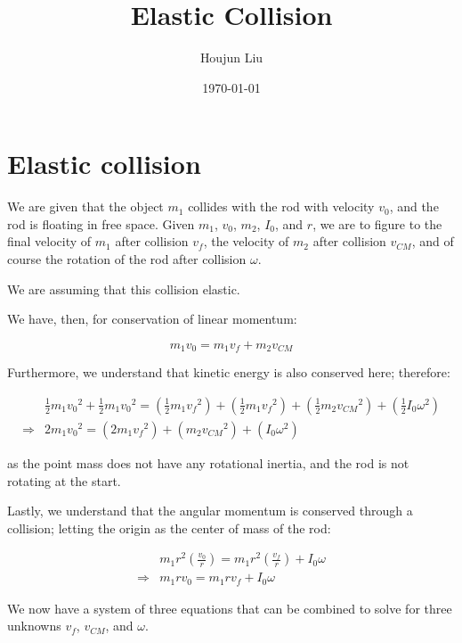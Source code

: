 \documentclass[letterpaper]{article}
\author{Houjun Liu}
\date{\today}
\title{Elastic Collision}
\renewcommand{\tableofcontents}{}
\renewcommand\maketitle{}
\begin{document}
\maketitle
\tableofcontents


\section{Elastic collision}
\label{sec:orga657e5a}
We are given that the object \(m_1\) collides with the rod with velocity \(v_0\), and the rod is floating in free space. Given \(m_1\), \(v_0\), \(m_2\), \(I_0\), and \(r\), we are to figure to the final velocity of \(m_1\) after collision \(v_f\), the velocity of \(m_2\) after collision \(v_{CM}\), and of course the rotation of the rod after collision \(\omega\).

We are assuming that this collision elastic.

We have, then, for conservation of linear momentum:

\begin{equation}
 m_1 v_0 = m_1v_f + m_2 v_{CM} 
\end{equation}

Furthermore, we understand that kinetic energy is also conserved here; therefore:

\begin{align}
&\frac{1}{2} m_1{v_0}^2 + \frac{1}{2} m_1 {v_0}^2 = \left(\frac{1}{2} m_1{v_f}^2\right)+\left(\frac{1}{2} m_1{v_f}^2\right)+\left(\frac{1}{2} m_2{v_{CM}}^2\right)+\left(\frac{1}{2} I_0{\omega}^2\right)\\
\Rightarrow & 2m_1{v_0}^2 = \left( 2m_1{v_f}^2\right)+\left( m_2{v_{CM}}^2\right)+\left( I_0{\omega}^2\right)
\end{align}

as the point mass does not have any rotational inertia, and the rod is not rotating at the start.

Lastly, we understand that the angular momentum is conserved through a collision; letting the origin as the center of mass of the rod:

\begin{align}
   &m_1 r^2 \left(\frac{v_0}{r}\right) = m_1 r^2 \left(\frac{v_f}{r}\right) + I_0 \omega\\
\Rightarrow &m_1 r v_0 = m_1 r v_f + I_0 \omega
\end{align}

We now have a system of three equations that can be combined to solve for three unknowns \(v_f\), \(v_{CM}\), and \(\omega\).
\end{document}

